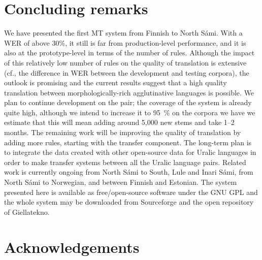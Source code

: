\documentclass[11pt]{article}
\newif\iffinal
\begin{document}
\section{Concluding remarks}
\label{sec:conclusions}

We have presented the first MT system from Finnish to North Sámi.
With a WER of above 30\%, it still is far from production-level performance, and it is also at the prototype-level in terms of the number of rules.
Although the impact of this relatively low number of rules on the quality of translation is extensive (cf., the difference in WER between the development and testing corpora), the outlook is promising and the current results suggest that a high quality translation between morphologically-rich agglutinative languages is possible.
We plan to continue development on the pair; the coverage of the system is already quite high, although we intend to increase it to 95~\% on the corpora we have
we estimate that this will mean adding around 5,000 new stems and take 1–2 months.
The remaining work will be improving the quality of translation by adding more rules, starting with the transfer component.
The long-term plan is to integrate the data created with other open-source data for Uralic languages in order to make transfer systems between all the Uralic language pairs.
Related work is currently ongoing from North Sámi to South, Lule and Inari Sámi, from North  Sámi to Norwegian, and between Finnish and Estonian.
The system presented here is available as free/open-source software under the GNU GPL and the whole system may be downloaded from Sourceforge and the open repository of Giellatekno.


\section*{Acknowledgements}
\label{sec:acknowlegdements}
\iffinal
The work on this North Sámi-Finnish machine translation system was partially funded by the Google Summer of Code and Google Code-In programmes, and partly by a Norsk forsingsråd grant (234299) on machine translation between Sámi languages.
\fi


\end{document}
